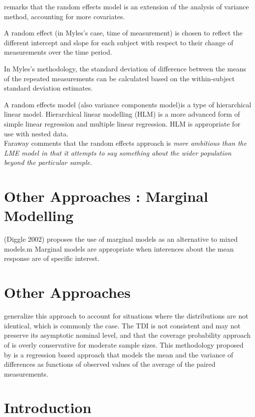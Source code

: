 \documentclass[12pt, a4paper]{report}
\theoremstyle{plain}
\theoremstyle{definition}
\theoremstyle{remark}
\begin{document}
\citet{Myles} remarks that the random effects model is an
extension of the analysis of variance method, accounting for more
covariates.

A random effect (in Myles's case, time of measurement) is chosen
to reflect the different intercept and slope for each subject with
respect to their change of measurements over the time period.

In Myles's methodology, the standard deviation of difference
between the means of the repeated measurements can be calculated
based on the within-subject standard deviation estimates.

A random effects model (also variance components model)is a type
of hierarchical linear model. Hierarchical linear modelling (HLM)
is a more advanced form of simple linear regression and multiple
linear regression. HLM is appropriate for use with nested
data.\\Faraway comments that the random effects approach is
\emph{more ambitious than the LME model in that it attempts to say
	something about the wider population beyond the particular
	sample}.

\section{Other Approaches : Marginal Modelling}
(Diggle 2002) proposes the use of marginal models as an
alternative to mixed models.m Marginal models are appropriate when
interences about the mean response are of specific interest.

\section{Other Approaches}


\citet{pkcng} generalize this approach to account for situations
where the distributions are not identical, which is commonly the
case. The TDI is not consistent and may not preserve its
asymptotic nominal level, and that the coverage probability
approach of \citet{lin2002} is overly conservative for moderate
sample sizes. This methodology proposed by \citet{pkcng} is a
regression based approach that models the mean and the variance of
differences as functions of observed values of the average of the
paired measurements.



\section{Introduction}
\end{document}
